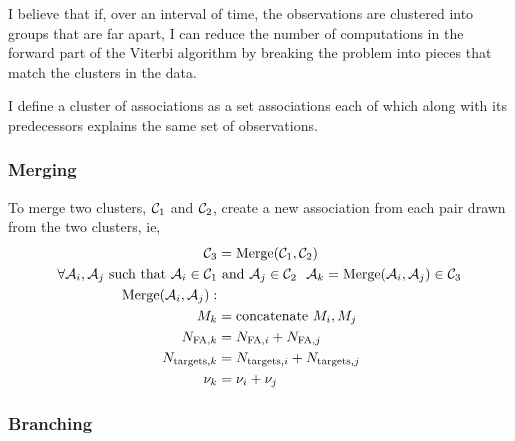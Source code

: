 \documentclass[11pt]{article}
\newcommand{\cA}{{\cal A}}
\newcommand{\cC}{{\cal C}}
\begin{document}
I believe that if, over an interval of time, the observations are
clustered into groups that are far apart, I can reduce the number of
computations in the forward part of the Viterbi algorithm by breaking
the problem into pieces that match the clusters in the data.

I define a cluster of associations as a set associations each of which
along with its predecessors explains the same set of observations.

\subsubsection{Merging}
\label{sec:merging}

To merge two clusters, $\cC_1$ and $\cC_2$, create a new association
from each pair drawn from the two clusters, ie,
\begin{align}
   \cC_3 &= \text{Merge}(\cC_1,\cC_2) \\
  \forall \cA_{i}, \cA_{j} \text{ such that } \cA_{i} \in \cC_1 &\text{
    and } \cA_{j} \in \cC_2 ~~ \cA_k = \text{Merge}(\cA_{i}, \cA_{j})
  \in \cC_3 \\
  \text{Merge}(\cA_{i}, \cA_{j}): \\
  M_k &= \text{concatenate } M_i, M_j \\
  N_{\text{FA},k} &= N_{\text{FA},i} + N_{\text{FA},j} \\
  N_{\text{targets},k} &= N_{\text{targets},i} + N_{\text{targets},j}
  \\
  \nu_k &= \nu_i +\nu_j
\end{align}

\subsubsection{Branching}
\label{sec:branching}
\end{document}
